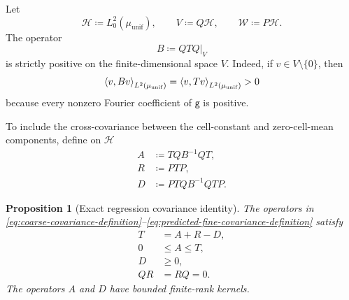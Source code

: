 \documentclass[11pt,reqno]{amsart}
\numberwithin{equation}{section}
\theoremstyle{plain}
\newtheorem{prop}[prop]{Proposition}
\theoremstyle{definition}
\DeclarePairedDelimiter{\ip}{\langle}{\rangle}
\newcommand{\g}{\mathsf g}
\newcommand{\muunif}{\mu_{\mathrm{unif}}}
\begin{document}
Let
\begin{equation}
 \mathcal H\coloneqq L_0^2(\muunif),
 \qquad
 V\coloneqq Q\mathcal H,
 \qquad
 \mathcal W\coloneqq P\mathcal H.
 \label{eq:coarse-fine-spaces}
\end{equation}
The operator
\begin{equation}
 B\coloneqq QTQ\big|_V
 \label{eq:coarse-block}
\end{equation}
is strictly positive on the finite-dimensional space $V$.  Indeed, if $v\in V\setminus\{0\}$, then
\begin{equation}
 \ip*{v,Bv}_{L^2(\muunif)}=\ip*{v,Tv}_{L^2(\muunif)}>0
 \label{eq:coarse-block-positive}
\end{equation}
because every nonzero Fourier coefficient of $\g$ is positive.

To include the cross-covariance between the cell-constant and zero-cell-mean components, define on $\mathcal H$
\begin{align}
 A&\coloneqq TQB^{-1}QT,
 \label{eq:coarse-covariance-definition}\\
 R&\coloneqq PTP,
 \label{eq:raw-fine-covariance-definition}\\
 D&\coloneqq PTQB^{-1}QTP.
 \label{eq:predicted-fine-covariance-definition}
\end{align}

\begin{prop}[Exact regression covariance identity]
\label{prop:regression-covariance-identity}
The operators in \eqref{eq:coarse-covariance-definition}--\eqref{eq:predicted-fine-covariance-definition} satisfy
\begin{align}
 T&=A+R-D,
 \label{eq:exact-regression-identity}\\
 0&\leq A\leq T,
 \label{eq:coarse-operator-order}\\
 D&\geq0,
 \label{eq:predicted-fine-positive}\\
 QR&=RQ=0.
 \label{eq:raw-fine-canonical-operator}
\end{align}
The operators $A$ and $D$ have bounded finite-rank kernels.
\end{prop}
\end{document}
